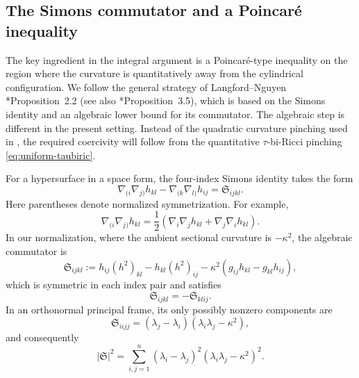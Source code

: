 \documentclass[11pt,reqno]{amsart}
\theoremstyle{definition}
\theoremstyle{remark}
\numberwithin{equation}{section}
\begin{document}
\subsection{The Simons commutator and a Poincar\'e inequality}
The key ingredient in the integral argument is a Poincar\'e-type inequality
on the region where the curvature is quantitatively away from the cylindrical
configuration.  We follow the general strategy of
 Langford--Nguyen \cite{LN21}*{Proposition~2.2} (see also \cite{LN25}*{Proposition~3.5}), which is based on the
 Simons identity and an algebraic lower bound for its commutator.
 The algebraic step is different in the present setting.  Instead of the
 quadratic curvature pinching used in \cite{LN21}, the required coercivity
 will follow from the quantitative $\tau$-bi-Ricci pinching
 \eqref{eq:uniform-taubiric}.

For a hypersurface in a space form, the four-index Simons identity takes the form
\begin{equation}\label{eq:full-simons}
 \nabla_{(i}\nabla_{j)}h_{kl}
 -\nabla_{(k}\nabla_{l)}h_{ij}
 =\mathfrak S_{ijkl}.
\end{equation}
Here parentheses denote normalized symmetrization. For example,
\begin{equation*}
 \nabla_{(i}\nabla_{j)}h_{kl}
 =\frac12\left(
 \nabla_i\nabla_jh_{kl}+\nabla_j\nabla_ih_{kl}
 \right).
\end{equation*} 
In our normalization, where the ambient sectional
curvature is $-\kappa^2$, the algebraic commutator is
\begin{equation}\label{eq:simons-commutator}
 \mathfrak S_{ijkl}
 :=h_{ij}(h^2)_{kl}-h_{kl}(h^2)_{ij}
   -\kappa^2(g_{ij}h_{kl}-g_{kl}h_{ij}),
\end{equation}
 which is symmetric in each index pair and satisfies
\begin{equation*}
 \mathfrak S_{ijkl}=-\mathfrak S_{klij}.
\end{equation*}
In an orthonormal principal frame, its only possibly nonzero components are
\begin{equation}\label{eq:simons-commutator-principal}
 \mathfrak S_{iijj}
 =(\lambda_j-\lambda_i)(\lambda_i\lambda_j-\kappa^2),
\end{equation}
and consequently
\begin{equation}\label{eq:simons-commutator-norm}
 |\mathfrak S|^2
 =\sum_{i,j=1}^n
 (\lambda_i-\lambda_j)^2(\lambda_i\lambda_j-\kappa^2)^2.
\end{equation}
\end{document}
